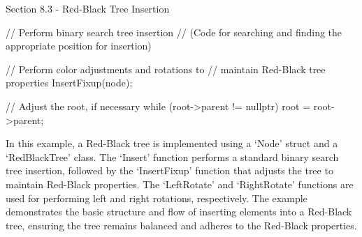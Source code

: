 \begin{notes}{Section 8.3 - Red-Black Tree Insertion}
\begin{highlight}
\begin{code}[C++]
{        // Perform binary search tree insertion
        // (Code for searching and finding the appropriate position for insertion)
    
        // Perform color adjustments and rotations to 
        // maintain Red-Black tree properties
        InsertFixup(node);
    
        // Adjust the root, if necessary
        while (root->parent != nullptr) {
            root = root->parent;
        }
    }
    \end{code}
        In this example, a Red-Black tree is implemented using a `Node' struct and a `RedBlackTree' class. The `Insert' function performs a standard binary search tree insertion, followed by the `InsertFixup' function that adjusts the tree to maintain Red-Black properties. The `LeftRotate' and `RightRotate' functions are used for performing 
        left and right rotations, respectively. The example demonstrates the basic structure and flow of inserting elements into a Red-Black tree, ensuring the tree remains balanced and adheres to the Red-Black properties.
    \end{highlight}
\end{notes}

